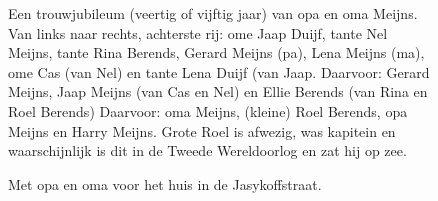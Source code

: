 \documentclass[12pt,twoside, openright]{memoir}
\begin{document}
\begin{figure}
\caption*{\footnotesize Een trouwjubileum (veertig of vijftig jaar) van opa en oma Meijns. Van links naar rechts, achterste rij: ome Jaap Duijf, tante Nel Meijns, tante Rina Berends, Gerard Meijns (pa), Lena Meijns (ma), ome Cas (van Nel) en tante Lena Duijf (van Jaap.
Daarvoor: Gerard Meijns, Jaap Meijns (van Cas en Nel) en Ellie Berends (van Rina en Roel Berends)
Daarvoor: oma Meijns, (kleine) Roel Berends, opa Meijns en Harry Meijns. Grote Roel is afwezig, was kapitein en waarschijnlijk is dit in de Tweede Wereldoorlog en zat hij op zee.}
\end{figure}

\begin{figure}
\caption*{\footnotesize Met opa en oma voor het huis in de Jasykoffstraat.}
\end{figure}
\end{document}
